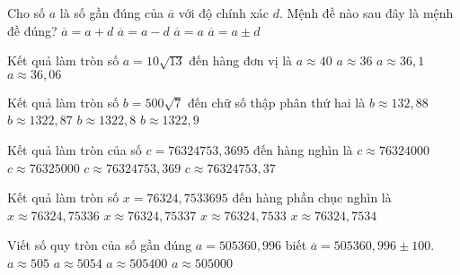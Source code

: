 \begin{ex}%
	Cho số $a$ là số gần đúng của $\overline{a}$ với độ chính xác $d$. Mệnh đề nào sau đây là mệnh đề đúng?
	\choice
	{$\overline{a}=a+d$}
	{$\overline{a}=a-d$}
	{$\overline{a}=a$}	
	{\True $\overline{a}=a\pm d$}
\end{ex}

\begin{ex}%
	Kết quả làm tròn số $a=10\sqrt{13}$ đến hàng đơn vị là
	\choice
	{$a\approx 40$}
	{\True $a\approx 36$}
	{$a\approx 36,1$}
	{$a\approx 36,06$}
\end{ex}

\begin{ex}%
	Kết quả làm tròn số $b=500\sqrt{7}$ đến chữ số thập phân thứ hai là
	\choice
	{\True $b\approx 132,88$}
	{$b\approx 1322,87$}
	{$b\approx 1322,8 $}
	{$b\approx 1322,9 $}
\end{ex}

\begin{ex}%
	Kết quả làm tròn của số $c=76324753,3695$ đến  hàng nghìn là
	\choice
	{$c\approx 76324000$}
	{\True $c\approx 76325000$}
	{$c\approx 76324753,369$}
	{$c\approx 76324753,37$}
\end{ex}

\begin{ex}%
	Kết quả làm tròn số $x=76324,7533695$ đến hàng phần chục nghìn là
	\choice
	{$x\approx 76324,75336$}
	{$x\approx 76324,75337$}
	{$x\approx 76324,7533$}
	{\True $x\approx 76324,7534$}
\end{ex}

\begin{ex}%
	Viết số quy tròn của số gần đúng $a=505360,996$ biết $\overline{a}=505360,996\pm 100$.
	\choice
	{$a\approx 505$}
	{$a\approx 5054$}
	{$a\approx 505400$}
	{\True $a\approx 505000$}
\end{ex}


